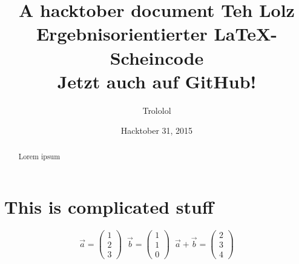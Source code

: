 \documentclass{article}
\title{A hacktober document}
\author{Trololol}
\date{Hacktober 31, 2015}
\title{
    Teh Lolz\\
  \vspace{7mm}
    Ergebnisorientierter {\LaTeX}-Scheincode\\
  \vspace{1cm}
  \large {
        Jetzt auch auf GitHub!\\
      \vspace{1cm}
    }
}
\begin{document}
	\maketitle	

	\thispagestyle{empty}
	\begin{abstract}
		Lorem ipsum
	\end{abstract}
	
	\newpage
	
	\section{This is complicated stuff}
	\begin{equation*}
		\vec{a} =
		\begin{pmatrix}
		1 \\
		2 \\
		3
		\end{pmatrix}\;\;
		\vec{b} =
		\begin{pmatrix}
		1 \\
		1 \\
		0
		\end{pmatrix}\;\;
		\vec{a} + \vec{b} = \begin{pmatrix}
		2 \\
		3 \\
		4
		\end{pmatrix}
	\end{equation*}
\end{document}
